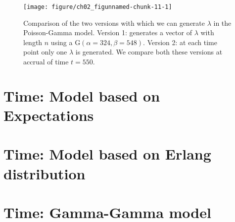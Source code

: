 \begin{figure}
\begin{knitrout}
\color{fgcolor}

{\centering \texttt{[image: figure/ch02\_figunnamed-chunk-11-1]} 

}


\end{knitrout}
  \caption{Comparison of the two versions with which we can generate $\lambda$ in the Poisson-Gamma model. Version 1: generates a vector of $\lambda$ with length $n$ using a $\textrm{G}(\alpha = 324, \beta = 548)$. Version 2: at each time point only one $\lambda$ is generated. We compare both these versions at accrual of time $t=550$.}
  \label{fig:2_7}
\end{figure}

\section{Time: Model based on Expectations}
\section{Time: Model based on Erlang distribution}
\section{Time: Gamma-Gamma model}
